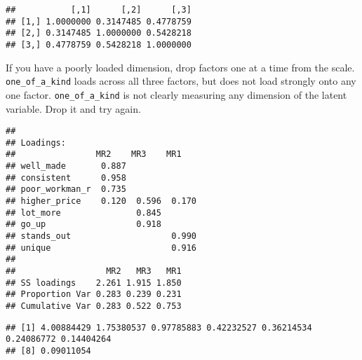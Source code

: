 \documentclass[
]{book}
\newenvironment{Shaded}{\begin{snugshade}}{\end{snugshade}}
\newcommand{\AttributeTok}[1]{\textcolor[rgb]{0.77,0.63,0.00}{#1}}
\newcommand{\DecValTok}[1]{\textcolor[rgb]{0.00,0.00,0.81}{#1}}
\newcommand{\FunctionTok}[1]{\textcolor[rgb]{0.00,0.00,0.00}{#1}}
\newcommand{\NormalTok}[1]{#1}
\newcommand{\OtherTok}[1]{\textcolor[rgb]{0.56,0.35,0.01}{#1}}
\newcommand{\SpecialCharTok}[1]{\textcolor[rgb]{0.00,0.00,0.00}{#1}}
\theoremstyle{definition}
\theoremstyle{definition}
\theoremstyle{definition}
\theoremstyle{definition}
\theoremstyle{remark}
\begin{document}
\begin{verbatim}
##           [,1]      [,2]      [,3]
## [1,] 1.0000000 0.3147485 0.4778759
## [2,] 0.3147485 1.0000000 0.5428218
## [3,] 0.4778759 0.5428218 1.0000000
\end{verbatim}

If you have a poorly loaded dimension, drop factors one at a time from the scale. \texttt{one\_of\_a\_kind} loads across all three factors, but does not load strongly onto any one factor. \texttt{one\_of\_a\_kind} is not clearly measuring any dimension of the latent variable. Drop it and try again.

\begin{Shaded}
\end{Shaded}

\begin{verbatim}
## 
## Loadings:
##                MR2    MR3    MR1   
## well_made       0.887              
## consistent      0.958              
## poor_workman_r  0.735              
## higher_price    0.120  0.596  0.170
## lot_more               0.845       
## go_up                  0.918       
## stands_out                    0.990
## unique                        0.916
## 
##                  MR2   MR3   MR1
## SS loadings    2.261 1.915 1.850
## Proportion Var 0.283 0.239 0.231
## Cumulative Var 0.283 0.522 0.753
\end{verbatim}

\begin{Shaded}
\end{Shaded}

\begin{verbatim}
## [1] 4.00884429 1.75380537 0.97785883 0.42232527 0.36214534 0.24086772 0.14404264
## [8] 0.09011054
\end{verbatim}

\begin{Shaded}
\end{Shaded}
\end{document}
